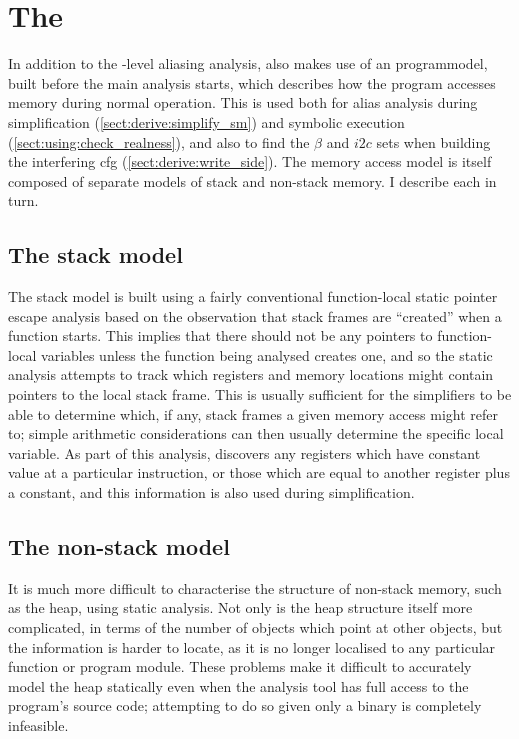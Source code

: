 \section{The }
\label{sect:program_model}

In addition to the {\StateMachine}-level aliasing analysis,
{\technique} also makes use of an \gls{programmodel}, built before the
main analysis starts, which describes how the program accesses memory
during normal operation.  This is used both for alias analysis during
{\StateMachine} simplification (\autoref{sect:derive:simplify_sm}) and
symbolic execution (\autoref{sect:using:check_realness}), and also to
find the $\beta$ and $i2c$ sets when building the interfering
\gls{cfg} (\autoref{sect:derive:write_side}).  The memory access model
is itself composed of separate models of stack and non-stack memory.
I describe each in turn.

\subsection{The stack model}
The stack model is built using a fairly conventional function-local
static pointer escape analysis\needCite{} based on the observation
that stack frames are ``created'' when a function starts.  This
implies that there should not be any pointers to function-local
variables unless the function being analysed creates one, and so the
static analysis attempts to track which registers and memory locations
might contain pointers to the local stack frame.  This is usually
sufficient for the {\StateMachine} simplifiers to be able to determine
which, if any, stack frames a given memory access might refer to;
simple arithmetic considerations can then usually determine the
specific local variable.  As part of this analysis, {\technique}
discovers any registers which have constant value at a particular
instruction, or those which are equal to another register plus a
constant, and this information is also used during {\StateMachine}
simplification.

\subsection{The non-stack model}

It is much more difficult to characterise the structure of non-stack
memory, such as the heap, using static analysis.  Not only is the heap
structure itself more complicated, in terms of the number of objects
which point at other objects, but the information is harder to locate,
as it is no longer localised to any particular function or program
module.  These problems make it difficult to accurately model the heap
statically even when the analysis tool has full access to the
program's source code\needCite{}; attempting to do so given only a
binary is completely infeasible.

